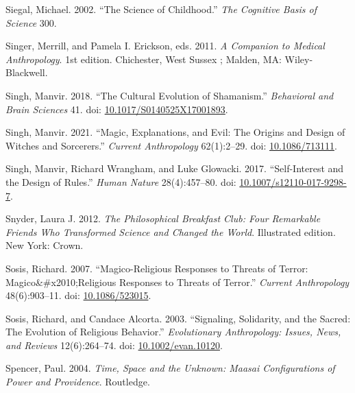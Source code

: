 \documentclass[
  11pt,
]{article}
\begin{document}
\leavevmode\hypertarget{ref-siegal200216}{}%
Siegal, Michael. 2002. ``The Science of Childhood.'' \emph{The Cognitive Basis of Science} 300.

\leavevmode\hypertarget{ref-singerCompanionMedicalAnthropology2011}{}%
Singer, Merrill, and Pamela I. Erickson, eds. 2011. \emph{A Companion to Medical Anthropology}. 1st edition. Chichester, West Sussex ; Malden, MA: Wiley-Blackwell.

\leavevmode\hypertarget{ref-singhCulturalEvolutionShamanism2018}{}%
Singh, Manvir. 2018. ``The Cultural Evolution of Shamanism.'' \emph{Behavioral and Brain Sciences} 41. doi: \href{https://doi.org/10.1017/S0140525X17001893}{10.1017/S0140525X17001893}.

\leavevmode\hypertarget{ref-singhMagicExplanationsEvil2021}{}%
Singh, Manvir. 2021. ``Magic, Explanations, and Evil: The Origins and Design of Witches and Sorcerers.'' \emph{Current Anthropology} 62(1):2--29. doi: \href{https://doi.org/10.1086/713111}{10.1086/713111}.

\leavevmode\hypertarget{ref-singhSelfInterestDesignRules2017}{}%
Singh, Manvir, Richard Wrangham, and Luke Glowacki. 2017. ``Self-Interest and the Design of Rules.'' \emph{Human Nature} 28(4):457--80. doi: \href{https://doi.org/10.1007/s12110-017-9298-7}{10.1007/s12110-017-9298-7}.

\leavevmode\hypertarget{ref-snyderPhilosophicalBreakfastClub2012}{}%
Snyder, Laura J. 2012. \emph{The Philosophical Breakfast Club: Four Remarkable Friends Who Transformed Science and Changed the World}. Illustrated edition. New York: Crown.

\leavevmode\hypertarget{ref-sosisMagicoReligiousResponses2007}{}%
Sosis, Richard. 2007. ``Magico-Religious Responses to Threats of Terror: Magico\&\#x2010;Religious Responses to Threats of Terror.'' \emph{Current Anthropology} 48(6):903--11. doi: \href{https://doi.org/10.1086/523015}{10.1086/523015}.

\leavevmode\hypertarget{ref-sosisSignalingSolidaritySacred2003}{}%
Sosis, Richard, and Candace Alcorta. 2003. ``Signaling, Solidarity, and the Sacred: The Evolution of Religious Behavior.'' \emph{Evolutionary Anthropology: Issues, News, and Reviews} 12(6):264--74. doi: \href{https://doi.org/10.1002/evan.10120}{10.1002/evan.10120}.

\leavevmode\hypertarget{ref-spencerTimeSpaceUnknown2004}{}%
Spencer, Paul. 2004. \emph{Time, Space and the Unknown: Maasai Configurations of Power and Providence}. Routledge.
\end{document}
